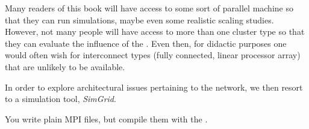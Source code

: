 

Many readers of this book will have access to some sort of parallel
machine so that they can run simulations, maybe even some realistic
scaling studies. However, not many people will have access to more
than one cluster type so that they can evaluate the influence of the
. Even then, for didactic purposes one would
often wish for interconnect types (fully connected, linear processor
array) that are unlikely to be available.

In order to explore architectural issues pertaining to the network, we
then resort to a simulation tool, \emph{SimGrid}.



You write plain MPI files, but compile them with the
 .


